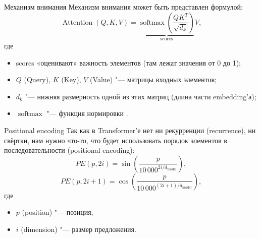 \begin{frame}[fragile]{Механизм внимания}%
  Механизм внимания может быть представлен формулой:
  \begin{equation}\label{scaled-dot-product-attention}%
    \operatorname{Attention}(Q, K, V) = \underbrace{
      \operatorname{softmax}\left(
        \frac{QK^T}{\sqrt{d_k}}
      \right)
    }_{\text{scores}}
    V,
  \end{equation}
  где
  \begin{itemize}%
    \item scores «оценивают» важность элементов (там лежат значения от 0 до 1);
    \item $Q$ (Query), $K$ (Key), $V$ (Value) "--- матрицы входных элементов;
    \item $d_k$ "--- нижняя размерность одной из этих матриц (длина части embedding'а);
    \item $\operatorname{softmax}$ "--- функция нормировки .
  \end{itemize}
\end{frame}


\begin{frame}[fragile]{Positional encoding}%
  Так как в Transformer'е нет ни рекурренции (recurrence), ни свёртки, нам нужно что-то, что будет использовать порядок элементов в последовательности (positional encoding):
  \begin{equation}\label{positional-encoding}%
    PE(p, 2i) = \sin\left( \frac{p}{10\,000^{2i / d_{\text{model}}}} \right),
  \end{equation}
  \begin{equation}\label{positional-encoding-2}%
    PE(p, 2i + 1) = \cos\left( \frac{p}{10\,000^{(2i + 1) / d_{\text{model}}}} \right),
  \end{equation}
  где
  \begin{itemize}%
    \item $p$ (position) "--- позиция,
    \item $i$ (dimension) "--- размер предложения.
  \end{itemize}
\end{frame}
